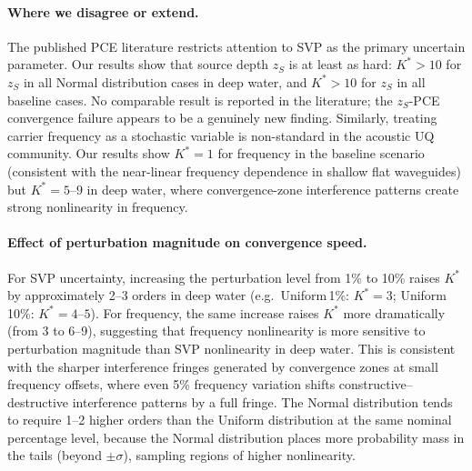 \documentclass[11pt,a4paper]{article}
\begin{document}
\paragraph{Where we disagree or extend.}
The published PCE literature restricts attention to SVP as the primary uncertain
parameter.
Our results show that source depth $z_S$ is at least as hard: $K^* > 10$ for $z_S$
in all Normal distribution cases in deep water, and $K^* > 10$ for $z_S$ in all
baseline cases.
No comparable result is reported in the literature; the $z_S$-PCE convergence failure
appears to be a genuinely new finding.
Similarly, treating carrier frequency as a stochastic variable is non-standard in
the acoustic UQ community.
Our results show $K^* = 1$ for frequency in the baseline scenario (consistent with
the near-linear frequency dependence in shallow flat waveguides) but $K^* = 5$--$9$
in deep water, where convergence-zone interference patterns create strong nonlinearity
in frequency.

\paragraph{Effect of perturbation magnitude on convergence speed.}
For SVP uncertainty, increasing the perturbation level from 1\% to 10\% raises
$K^*$ by approximately 2--3 orders in deep water (e.g.\ Uniform\,1\%: $K^* = 3$;
Uniform\,10\%: $K^* = 4$--$5$).
For frequency, the same increase raises $K^*$ more dramatically (from 3 to 6--9),
suggesting that frequency nonlinearity is more sensitive to perturbation magnitude
than SVP nonlinearity in deep water.
This is consistent with the sharper interference fringes generated by convergence
zones at small frequency offsets, where even 5\% frequency variation shifts
constructive--destructive interference patterns by a full fringe.
The Normal distribution tends to require 1--2 higher orders than the Uniform
distribution at the same nominal percentage level, because the Normal distribution
places more probability mass in the tails (beyond $\pm\sigma$), sampling regions
of higher nonlinearity.
\end{document}
